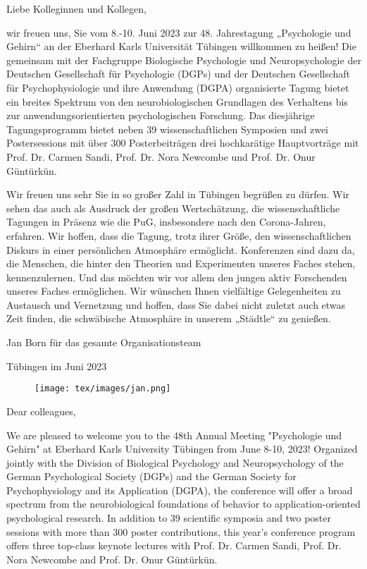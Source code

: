 Liebe Kolleginnen und Kollegen,

wir freuen uns, Sie vom 8.-10. Juni 2023 zur 48. Jahrestagung „Psychologie und Gehirn“ an der Eberhard Karls Universität Tübingen willkommen zu heißen! Die gemeinsam mit der Fachgruppe Biologische Psychologie und Neuropsychologie der Deutschen Gesellschaft für Psychologie (DGPs) und der Deutschen Gesellschaft für Psychophysiologie und ihre Anwendung (DGPA) organisierte Tagung bietet ein breites Spektrum von den neurobiologischen Grundlagen des Verhaltens bis zur anwendungsorientierten psychologischen Forschung. Das diesjährige Tagungsprogramm bietet neben 39 wissenschaftlichen Symposien und zwei Postersessions mit über 300 Posterbeiträgen drei hochkarätige Hauptvorträge mit Prof. Dr. Carmen Sandi, Prof. Dr. Nora Newcombe und Prof. Dr. Onur Güntürkün.

Wir freuen uns sehr Sie in so großer Zahl in Tübingen begrüßen zu dürfen. Wir sehen das auch als Ausdruck der großen Wertschätzung, die wissenschaftliche Tagungen in Präsenz wie die PuG, insbesondere nach den Corona-Jahren, erfahren. Wir hoffen, dass die Tagung, trotz ihrer Größe, den wissenschaftlichen Diskurs in einer persönlichen Atmosphäre ermöglicht. Konferenzen sind dazu da, die Menschen, die hinter den Theorien und Experimenten unseres Faches stehen, kennenzulernen. Und das möchten wir vor allem den jungen aktiv Forschenden unseres Faches ermöglichen. Wir wünschen Ihnen vielfältige Gelegenheiten zu Austausch und Vernetzung und hoffen, dass Sie dabei nicht zuletzt auch etwas Zeit finden, die schwäbische Atmosphäre in unserem „Städtle“ zu genießen.

Jan Born für das gesamte Organisationsteam

Tübingen im Juni 2023

\vspace*{-2cm}

\begin{figure}
	\raggedleft
	\texttt{[image: tex/images/jan.png]}
\end{figure}


\newpage


\vspace*{2.2cm}

Dear colleagues,

We are pleased to welcome you to the 48th Annual Meeting "Psychologie und Gehirn" at Eberhard Karls University Tübingen from June 8-10, 2023! Organized jointly with the Division of Biological Psychology and Neuropsychology of the German Psychological Society (DGPs) and the German Society for Psychophysiology and its Application (DGPA), the conference will offer a broad spectrum from the neurobiological foundations of behavior to application-oriented psychological research. In addition to 39 scientific symposia and two poster sessions with more than 300 poster contributions, this year's conference program offers three top-class keynote lectures with Prof. Dr. Carmen Sandi, Prof. Dr. Nora Newcombe and Prof. Dr. Onur Güntürkün.

